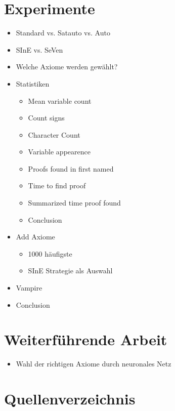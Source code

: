 \documentclass[german,version-2020-11]{uzl-thesis}
\begin{document}
\chapter{Experimente}
  \begin{itemize}
    \item Standard vs. Satauto vs. Auto
    \item SInE vs. SeVen 
    \item Welche Axiome werden gewählt?
    \item Statistiken
      \begin{itemize}
        \item Mean variable count
        \item Count signs
        \item Character Count
        \item Variable appearence
        \item Proofs found in first named
        \item Time to find proof
        \item Summarized time proof found
        \item Conclusion
      \end{itemize}
    \item Add Axiome
      \begin{itemize}
        \item 1000 häufigste
        \item SInE Strategie als Auswahl
      \end{itemize}
    \item Vampire
    \item Conclusion
  \end{itemize}
\chapter{Weiterführende Arbeit}
\begin{itemize}
  \item Wahl der richtigen Axiome durch neuronales Netz
\end{itemize}
\chapter{Quellenverzeichnis}
\end{document}
